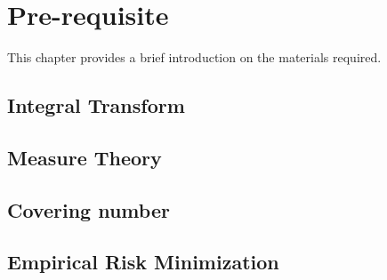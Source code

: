 \chapter{Pre-requisite}

This chapter provides a brief introduction on the materials required. 

\section{Integral Transform}

\section{Measure Theory}

\section{Covering number}

\section{Empirical Risk Minimization}

